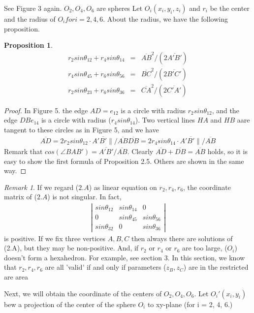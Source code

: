 \documentclass[dvipdfmx]{interact}
\theoremstyle{plain}%
\newtheorem{proposition}[theorem]{Proposition}
\theoremstyle{definition}
\theoremstyle{remark}
\newtheorem{remark}{Remark}
\theoremstyle{problemstyle}
\begin{document}
See Figure 3 again. $O_2, O_4, O_6$ are spheres Let $O_i(x_i, y_i, z_i)$
and $r_i$ be the center and the radius of $O_i for i = 2, 4, 6.$ About
the radius, we have the following proposition.

\begin{proposition}
 \begin{eqnarray}
 r_2sin\theta_{12} + r_4sin\theta_{14} &=& \overline{AB}^2 / (2\overline{A'B'})\\
 r_4sin\theta_{45} + r_6sin\theta_{56} &=& \overline{BC}^2 / (2\overline{B'C'})\\
 r_2sin\theta_{23} + r_6sin\theta_{36} &=& \overline{CA}^2 / (2\overline{C'A'})
 \end{eqnarray}
\end{proposition}

\begin{proof}
 In Figure 5. the edge $AD = e_{12}$ is a circle with radius
 $r_2sin\theta_{12}$, and the edge $DB e_{14}$ is a circle with radius
 ($r_4sin\theta_{14}$).
Two vertical lines $HA$ and $HB$ aare tangent to these circles as in
 Figure 5,
 and we have 
 \begin{eqnarray*}
  \overline{AD} = 2 r_2 sin\theta_{12} \cdot \overline{A'B'\|}/\overline{AB}
  \overline{DB} = 2 r_4 sin\theta_{14} \cdot \overline{A'B'\|}/\overline{AB}
 \end{eqnarray*}
 Remark that $cos(\angle BAB') =\overline{A'B'}/\overline{AB}.$ Clearly
 $\overline{AD} + \overline{DB} = \overline{AB}$ holds, so it is easy to
 show the first formula of Proposition 2.5. Others are shown in the same
 way.

\end{proof}

\begin{remark}
 If we regard ($2.A$) as linear equation on $r_2, r_4, r_6$, the
 coordinate matrix of ($2.A$) is not singular. In fact,
 \begin{eqnarray*}
  \left| 
   \begin{array}{ccc}
    sin\theta_{12} & sin\theta_{14} & 0\\
    0              & sin\theta_{45} & sin\theta_{56}\\
    sin\theta_{32} & 0              & sin\theta_{36}
   \end{array}
  \right|
 \end{eqnarray*}
 is positive.
 If we fix three vertices $A, B, C$ then always there are solutions of
 (2.A), but they may be non-positive. And, if $r_2$ or $r_4$ or $r_6$
 are too large, ($O_i$) doesn't form a hexahedron. For example, see
 section 3. In this section, we know that $r_2, r_4, r_6$ are all
 'valid' if and only if parameters ($z_B, z_C$) are in the restricted are
 area

Next, we will obtain the coordinate of the centers of $O_2, O_4, O_6$.
Let $O_i'(x_i, y_i)$bew a projection of the center of the sphere $O_i$
 to xy-plane (for i = 2, 4, 6.)
\end{remark}
\end{document}
